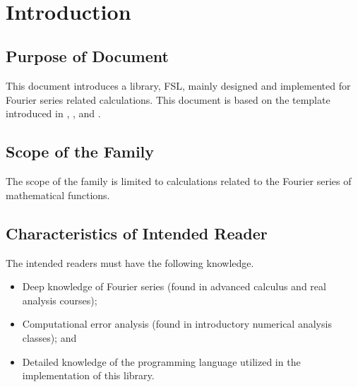 \documentclass[12pt]{article}
\newcommand{\famname}{FSL} %
\begin{document}
\newpage

\tableofcontents

~\newpage


\section{Introduction}

\subsection{Purpose of Document}
This document introduces a library, \famname, mainly designed and implemented 
for Fourier series related calculations. This document is based on the 
template introduced in \cite{Smith2006}, \cite{SmithAndLai2005}, 
and \cite{SmithMcCutchanAndCarette2017}.

\subsection{Scope of the Family} 
The scope of the family is limited to calculations related to the Fourier 
series of mathematical functions.

\subsection{Characteristics of Intended Reader} 
The intended readers must have the following knowledge.
\begin{itemize}
	\item Deep knowledge of Fourier series (found in advanced 
	calculus and real analysis courses);
	\item Computational error analysis (found in introductory numerical 
	analysis classes); and
	\item Detailed knowledge of the programming language utilized 
	in the implementation of this library.	
\end{itemize}
\end{document}
